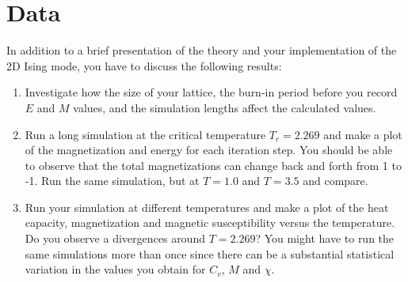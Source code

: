 \documentclass{article}
\begin{document}
\section{Data}

In addition to a brief presentation of the theory and your implementation of the 2D Ising mode,
you have to discuss the following results:

\begin{enumerate}
    \item Investigate how the size of your lattice, the burn-in period before you
      record $E$ and $M$ values, and the simulation lengths affect the calculated values.

    \item Run a long simulation at the critical temperature $T_c = 2.269$ and make a
      plot of the magnetization and energy for each iteration step.
      You should be able to observe that the total magnetizations can change
      back and forth from 1 to -1. Run the same simulation, but at $T= 1.0$ and $T = 3.5$ and compare.

    \item Run your simulation at different temperatures and make a plot of the heat capacity,
    magnetization and magnetic susceptibility versus the temperature.
    Do you observe a divergences around $T = 2.269$? You might have to run the
    same simulations more than once since there can be a substantial statistical
    variation in the values you obtain for $C_v$, $M$ and $\chi$.
\end{enumerate}


\end{document}
